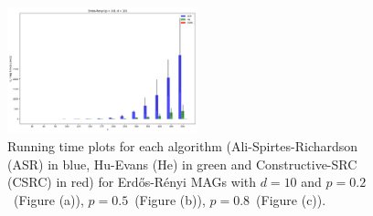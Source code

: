 \documentclass[a4paper]{article}
\begin{document}
\begin{figure}[htbp]
	\centering
	\hfill
	
	\includegraphics[width=0.49\textwidth]{figures/Figure_9.png}
	
	\caption{Running time plots for each algorithm (Ali-Spirtes-Richardson (ASR) in blue, Hu-Evans (He) in green and Constructive-SRC (CSRC) in red) for Erd\H{o}s-R\'{e}nyi MAGs with $d=10$ and $p=0.2$~(Figure (a)), $p=0.5$~(Figure (b)), $p=0.8$~(Figure (c)).}
	\label{fig:er-10-ap}
\end{figure}
\end{document}
